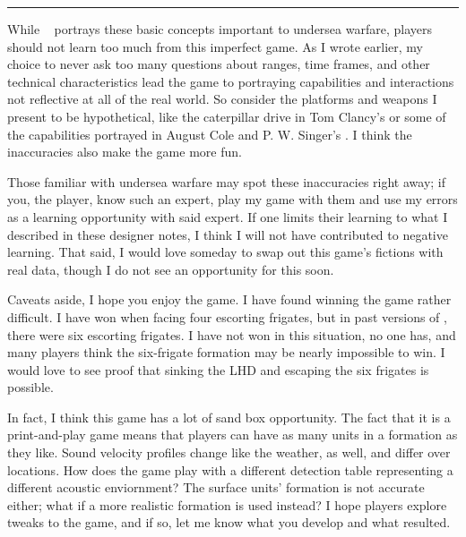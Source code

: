 \documentclass[../TacSubGameRules.tex]{subfiles}
\begin{document}
\begin{center}
    \noindent\rule{0.8\linewidth}{1pt}
\end{center}

While \gametitle~ portrays these basic concepts important to undersea warfare, players should not learn too much from this imperfect game.
As I wrote earlier, my choice to never ask too many questions about ranges, time frames, and other technical characteristics lead the game to portraying capabilities and interactions not reflective at all of the real world.
So consider the platforms and weapons I present to be hypothetical, like the caterpillar drive in Tom Clancy's  or some of the capabilities portrayed in August Cole and P. W. Singer's .
I think the inaccuracies also make the game more fun.

Those familiar with undersea warfare may spot these inaccuracies right away; if you, the player, know such an expert, play my game with them and use my errors as a learning opportunity with said expert.
If one limits their learning to what I described in these designer notes, I think I will not have contributed to negative learning.
That said, I would love someday to swap out this game's fictions with real data, though I do not see an opportunity for this soon.

Caveats aside, I hope you enjoy the game.
I have found winning the game rather difficult.
I have won when facing four escorting frigates, but in past versions of \gametitle, there were six escorting frigates.
I have not won in this situation, no one has, and many players think the six-frigate formation may be nearly impossible to win.
I would love to see proof that sinking the LHD and escaping the six frigates is possible.

In fact, I think this game has a lot of sand box opportunity.
The fact that it is a print-and-play game means that players can have as many units in a formation as they like.
Sound velocity profiles change like the weather, as well, and differ over locations.
How does the game play with a different detection table representing a different acoustic enviornment?
The surface units' formation is not accurate either; what if a more realistic formation is used instead?
I hope players explore tweaks to the game, and if so, let me know what you develop and what resulted.
\end{document}
